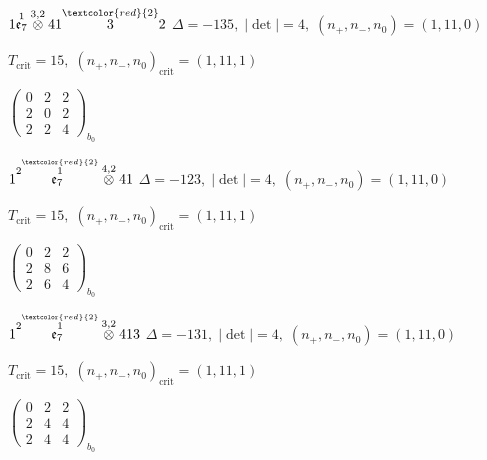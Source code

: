 \documentclass[10pt]{article}
\begin{document}
\smallskip

$1\overset{1}{\mathfrak{e}_7}\overset{3,2}{\otimes}41\overset{\textcolor{red}{2}}{3}2$ \quad $\Delta=-135,\; |\det|=4,\; (n_+,n_-,n_0)=(1,11,0)$

\hspace{1em}$T_{\text{crit}}=15,\; (n_+,n_-,n_0)_{\text{crit}}=(1,11,1)$

\hspace{2em}$\left(\begin{smallmatrix}0 & 2 & 2 \\ 2 & 0 & 2 \\ 2 & 2 & 4\end{smallmatrix}\right)_{\!b_0}$

\smallskip

$1\overset{2\overset{\textcolor{red}{2}}{1}}{\mathfrak{e}_7}\overset{4,2}{\otimes}41$ \quad $\Delta=-123,\; |\det|=4,\; (n_+,n_-,n_0)=(1,11,0)$

\hspace{1em}$T_{\text{crit}}=15,\; (n_+,n_-,n_0)_{\text{crit}}=(1,11,1)$

\hspace{2em}$\left(\begin{smallmatrix}0 & 2 & 2 \\ 2 & 8 & 6 \\ 2 & 6 & 4\end{smallmatrix}\right)_{\!b_0}$

\smallskip

$1\overset{2\overset{\textcolor{red}{2}}{1}}{\mathfrak{e}_7}\overset{3,2}{\otimes}413$ \quad $\Delta=-131,\; |\det|=4,\; (n_+,n_-,n_0)=(1,11,0)$

\hspace{1em}$T_{\text{crit}}=15,\; (n_+,n_-,n_0)_{\text{crit}}=(1,11,1)$

\hspace{2em}$\left(\begin{smallmatrix}0 & 2 & 2 \\ 2 & 4 & 4 \\ 2 & 4 & 4\end{smallmatrix}\right)_{\!b_0}$

\smallskip
\end{document}
